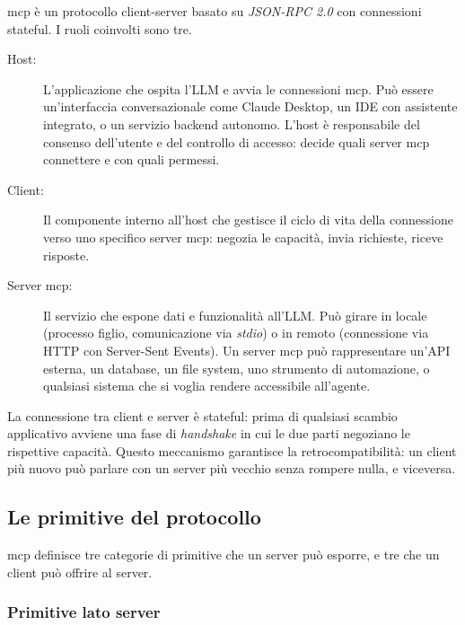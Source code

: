 \gls{mcp} è un protocollo client-server basato su \emph{JSON-RPC 2.0} con connessioni stateful. I
ruoli coinvolti sono tre.

\begin{description}
  \item[Host:] L'applicazione che ospita l'LLM e avvia le connessioni \gls{mcp}. Può essere
    un'interfaccia conversazionale come Claude Desktop, un IDE con assistente integrato,
    o un servizio backend autonomo. L'host è responsabile del consenso dell'utente e
    del controllo di accesso: decide quali server \gls{mcp} connettere e con quali permessi.
  \item[Client:] Il componente interno all'host che gestisce il ciclo di vita della
    connessione verso uno specifico server \gls{mcp}: negozia le capacità, invia richieste,
    riceve risposte.
  \item[Server \gls{mcp}:] Il servizio che espone dati e funzionalità all'LLM. Può girare
    in locale (processo figlio, comunicazione via \emph{stdio}) o in remoto (connessione
    via HTTP con Server-Sent Events). Un server \gls{mcp} può rappresentare un'API esterna,
    un database, un file system, uno strumento di automazione, o qualsiasi sistema
    che si voglia rendere accessibile all'agente.
\end{description}
La connessione tra client e server è stateful: prima di qualsiasi scambio applicativo
avviene una fase di \emph{handshake} in cui le due parti negoziano le rispettive
capacità. Questo meccanismo garantisce la retrocompatibilità: un client più nuovo può
parlare con un server più vecchio senza rompere nulla, e viceversa.

\subsection{Le primitive del protocollo}
\label{sec:mcp-primitive}

\gls{mcp} definisce tre categorie di primitive che un server può esporre, e tre che un client
può offrire al server.

\subsubsection{Primitive lato server}

